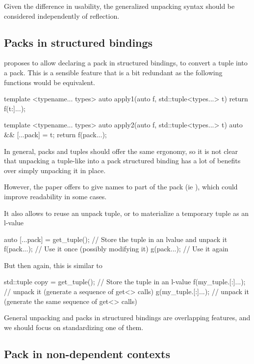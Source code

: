 \documentclass{wg21}
\begin{document}
Given the difference in usability, the generalized unpacking syntax should be considered independently of reflection.

\subsection{Packs in structured bindings}
\label{sec:packsinbindings}

 proposes to allow declaring a pack in structured bindings, to convert a tuple into a pack.
This is a sensible feature that is a bit redundant as the following functions would be equivalent.

\begin{colorblock}
template <typename... types>
auto apply1(auto f, std::tuple<types...> t) {
    return f(t:]...);
}

template <typename... types>
auto apply2(auto f, std::tuple<types...> t) {
    auto && [...pack] = t;
    return f(pack...);
}
\end{colorblock}

In general, packs and tuples should offer the same ergonomy, so it is not clear that unpacking a tuple-like into
a pack structured binding has a lot of benefits over simply unpacking it in place.

However, the paper offers to give names to part of the pack (ie ),
which could improve readability in some cases.

It also allows to reuse an unpack tuple, or to materialize a temporary tuple as an l-value

\begin{colorblock}
auto [...pack] = get_tuple();  // Store the tuple in an lvalue and unpack it
f(pack...);          // Use it once (possibly modifying it)
g(pack...);          // Use it again
\end{colorblock}

But then again, this is similar to

\begin{colorblock}
std::tuple copy = get_tuple();  // Store the tuple in an l-value
f(my_tuple.[:]...); // unpack it (generate a sequence of get<> calls)
g(my_tuple.[:]...); // unpack it (generate the same sequence of get<> calls)
\end{colorblock}


General unpacking and packs in structured bindings are overlapping features, and we should focus on standardizing one of them.

\subsection{Pack in non-dependent contexts}
\label{sec:packsoutsideoftemplate}
\end{document}
